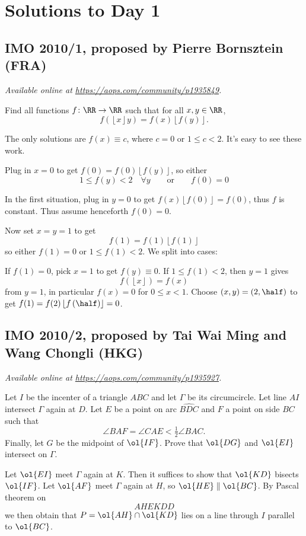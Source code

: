 \documentclass[11pt]{scrartcl}
\begin{document}
\section{Solutions to Day 1}
\subsection{IMO 2010/1, proposed by Pierre Bornsztein (FRA)}
\textsl{Available online at \url{https://aops.com/community/p1935849}.}
\begin{mdframed}[style=mdpurplebox,frametitle={Problem statement}]
Find all functions $f \colon \RR \to \RR$ such that for all $x,y \in \RR$,
\[ f(\left\lfloor x\right\rfloor y) = f(x)\left\lfloor f(y)\right\rfloor. \]
\end{mdframed}
The only solutions are $f(x) \equiv c$,
where $c = 0$ or $1 \le c < 2$.
It's easy to see these work.

Plug in $x=0$ to get $f(0) = f(0) \left\lfloor f(y) \right\rfloor$,
so either
\[ 1 \le f(y) < 2 \quad \forall y
  \qquad\text{or}\qquad f(0) = 0 \]

In the first situation,
plug in $y=0$ to get $f(x) \left\lfloor f(0) \right\rfloor = f(0)$,
thus $f$ is constant.
Thus assume henceforth $f(0) = 0$.

Now set $x=y=1$ to get
\[ f(1) = f(1) \left\lfloor f(1) \right\rfloor \]
so either $f(1) = 0$ or $1 \le f(1) < 2$.
We split into cases:
\begin{itemize}
  \ii If $f(1) = 0$, pick $x=1$ to get $f(y) \equiv 0$.
  \ii If $1 \le f(1) < 2$,
  then $y=1$ gives
  \[ f(\left\lfloor x \right\rfloor) = f(x) \]
  from $y=1$, in particular $f(x) = 0$ for $0 \le x < 1$.
  Choose $(x,y) = \left( 2, \half \right)$ to get
  $f(1) = f(2) \left\lfloor f\left( \half \right) \right\rfloor = 0$.
\end{itemize}
\pagebreak

\subsection{IMO 2010/2, proposed by Tai Wai Ming and Wang Chongli (HKG)}
\textsl{Available online at \url{https://aops.com/community/p1935927}.}
\begin{mdframed}[style=mdpurplebox,frametitle={Problem statement}]
Let $I$ be the incenter of a triangle $ABC$ and let $\Gamma$ be its circumcircle.
Let line $AI$ intersect $\Gamma$ again at $D$.
Let $E$ be a point on arc $\widehat{BDC}$ and $F$ a point on side $BC$ such that
\[ \angle BAF = \angle CAE < \tfrac12 \angle BAC. \]
Finally, let $G$ be the midpoint of $\ol{IF}$.
Prove that $\ol{DG}$ and $\ol{EI}$ intersect on $\Gamma$.
\end{mdframed}
Let $\ol{EI}$ meet $\Gamma$ again at $K$.
Then it suffices to show that $\ol{KD}$ bisects $\ol{IF}$.
Let $\ol{AF}$ meet $\Gamma$ again at $H$, so $\ol{HE} \parallel \ol{BC}$.
By Pascal theorem on \[ AHEKDD \]
we then obtain that $P = \ol{AH} \cap \ol{KD}$ lies on a line through $I$
parallel to $\ol{BC}$.
\end{document}

